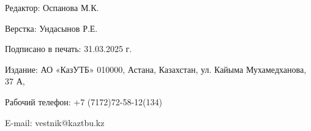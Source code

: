 \newpage

\thispagestyle{empty}
\null
\vfill
\begin{center}
Редактор: Оспанова М.К.

Верстка: Ундасынов Р.Е.

Подписано в печать: 31.03.2025 г.

Издание: АО «КазУТБ» 010000, Астана, Казахстан, ул. Кайыма Мухамедханова, 37 А,

Рабочий телефон: +7 (7172)72-58-12(134)

E-mail: vestnik@kaztbu.kz
\end{center}
\vfill
\null
